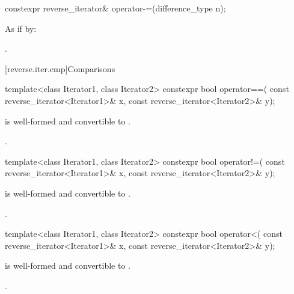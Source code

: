%
\begin{itemdecl}
constexpr reverse_iterator& operator-=(difference_type n);
\end{itemdecl}

\begin{itemdescr}
\pnum
\effects
As if by: 

\pnum
\returns
{}.
\end{itemdescr}

[reverse.iter.cmp]{Comparisons}

%
\begin{itemdecl}
template<class Iterator1, class Iterator2>
  constexpr bool operator==(
    const reverse_iterator<Iterator1>& x,
    const reverse_iterator<Iterator2>& y);
\end{itemdecl}

\begin{itemdescr}
\pnum
\constraints
{} is well-formed and
convertible to .

\pnum
\returns
{}.
\end{itemdescr}

%
\begin{itemdecl}
template<class Iterator1, class Iterator2>
  constexpr bool operator!=(
    const reverse_iterator<Iterator1>& x,
    const reverse_iterator<Iterator2>& y);
\end{itemdecl}

\begin{itemdescr}
\pnum
\constraints
{} is well-formed and
convertible to .

\pnum
\returns
{}.
\end{itemdescr}

%
\begin{itemdecl}
template<class Iterator1, class Iterator2>
  constexpr bool operator<(
    const reverse_iterator<Iterator1>& x,
    const reverse_iterator<Iterator2>& y);
\end{itemdecl}

\begin{itemdescr}
\pnum
\constraints
{} is well-formed and
convertible to .

\pnum
\returns
{}.
\end{itemdescr}

